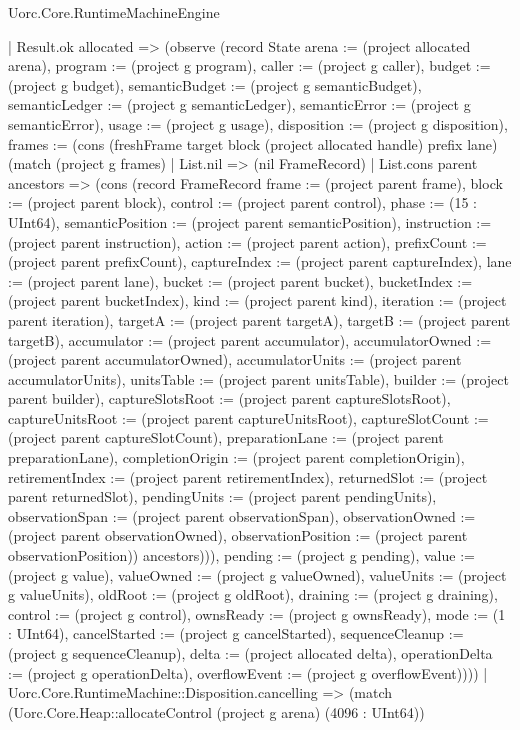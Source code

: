 \begin{lexlean}{Uorc.Core.RuntimeMachineEngine}
\begin{semanticmodule}
{        | Result.ok allocated => (observe (record State {arena := (project allocated arena), program := (project g program), caller := (project g caller), budget := (project g budget), semanticBudget := (project g semanticBudget), semanticLedger := (project g semanticLedger), semanticError := (project g semanticError), usage := (project g usage), disposition := (project g disposition), frames := (cons (freshFrame target block (project allocated handle) prefix lane) (match (project g frames)
          | List.nil => (nil FrameRecord)
          | List.cons parent ancestors => (cons (record FrameRecord {frame := (project parent frame), block := (project parent block), control := (project parent control), phase := (15 : UInt64), semanticPosition := (project parent semanticPosition), instruction := (project parent instruction), action := (project parent action), prefixCount := (project parent prefixCount), captureIndex := (project parent captureIndex), lane := (project parent lane), bucket := (project parent bucket), bucketIndex := (project parent bucketIndex), kind := (project parent kind), iteration := (project parent iteration), targetA := (project parent targetA), targetB := (project parent targetB), accumulator := (project parent accumulator), accumulatorOwned := (project parent accumulatorOwned), accumulatorUnits := (project parent accumulatorUnits), unitsTable := (project parent unitsTable), builder := (project parent builder), captureSlotsRoot := (project parent captureSlotsRoot), captureUnitsRoot := (project parent captureUnitsRoot), captureSlotCount := (project parent captureSlotCount), preparationLane := (project parent preparationLane), completionOrigin := (project parent completionOrigin), retirementIndex := (project parent retirementIndex), returnedSlot := (project parent returnedSlot), pendingUnits := (project parent pendingUnits), observationSpan := (project parent observationSpan), observationOwned := (project parent observationOwned), observationPosition := (project parent observationPosition)}) ancestors))), pending := (project g pending), value := (project g value), valueOwned := (project g valueOwned), valueUnits := (project g valueUnits), oldRoot := (project g oldRoot), draining := (project g draining), control := (project g control), ownsReady := (project g ownsReady), mode := (1 : UInt64), cancelStarted := (project g cancelStarted), sequenceCleanup := (project g sequenceCleanup), delta := (project allocated delta), operationDelta := (project g operationDelta), overflowEvent := (project g overflowEvent)})))
      | Uorc.Core.RuntimeMachine::Disposition.cancelling => (match (Uorc.Core.Heap::allocateControl (project g arena) (4096 : UInt64))
}
\end{semanticmodule}
\end{lexlean}
